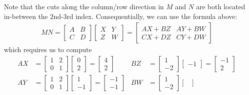 \begin{solution}
Note that the cuts along the column/row direction in $M$ and $N$ are both located in-between the $2$nd-$3$rd index. Consequentially, we can use the formula above:
\begin{align*}
MN = 
\begin{bmatrix}
A & B \\
C & D
\end{bmatrix} 
\begin{bmatrix}
X & Y \\
Z & W
\end{bmatrix} 
=
\begin{bmatrix}
AX + BZ & AY + BW \\
CX + DZ & CY + DW
\end{bmatrix}
\end{align*}
which requires us to compute
\begin{align*}
AX &=
\begin{bmatrix}
1 & 2 \\
0 & 1
\end{bmatrix}
\begin{bmatrix}
0 \\
2 
\end{bmatrix}
=
\begin{bmatrix}
4 \\
2
\end{bmatrix}
&
BZ &=
\begin{bmatrix}
1 \\
-2
\end{bmatrix}
\begin{bmatrix}
-1
\end{bmatrix}
=
\begin{bmatrix}
-1 \\
2
\end{bmatrix} \\
AY &=
\begin{bmatrix}
1 & 2 \\
0 & 1
\end{bmatrix}
\begin{bmatrix}
1 \\
-1
\end{bmatrix}
=
\begin{bmatrix}
-1 \\
-1
\end{bmatrix}
&
BW &=
\begin{bmatrix}
1 \\
-2
\end{bmatrix}
\begin{bmatrix}

\end{bmatrix}
\end{align*}
\end{solution}
